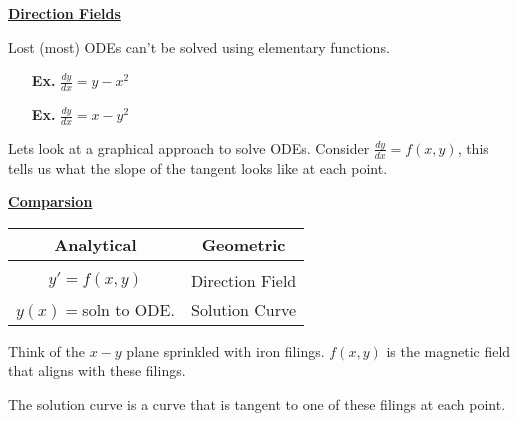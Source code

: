 \documentclass{letter}
\newcommand{\0}[1]{\begin{bmatrix}#1\end{bmatrix}}
\newcommand{\h}[1]{\underline{\textbf{#1}}}
\begin{document}
	\h{Direction Fields}
	
	Lost (most) ODEs can't be solved using elementary functions.
	
	\begin{itemize}
		\item[\textbf{Ex. }] $\frac{dy}{dx} = y - x^2$
		\item[\textbf{Ex. }] $\frac{dy}{dx} = x - y^2$
	\end{itemize}
	
	Lets look at a graphical approach to solve ODEs. Consider $\frac{dy}{dx} = f(x, y)$, this tells us what the slope of the tangent looks like at each point.
	
	\h{Comparsion}
	
	\begin{tabular}{c|c}
		Analytical&Geometric\\
		\hline\\
		$y' = f(x, y)$ & Direction Field\\
		$y(x) = $soln to ODE. & Solution Curve
	\end{tabular}
	
	Think of the $x-y$ plane sprinkled with iron filings. $f(x, y)$ is the magnetic field that aligns with these filings.
	
	The solution curve is a curve that is tangent to one of these filings at each point.
\end{document}
